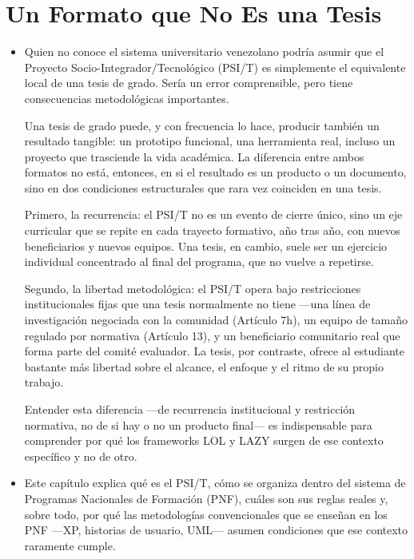 \documentclass[14pt,a4paper,oneside]{extbook}
\begin{document}
\section{ Un Formato que No Es una Tesis}
\begin{itemize}
\item Quien no conoce el sistema universitario venezolano podría asumir que el Proyecto Socio-Integrador/Tecnológico (PSI/T) es simplemente el equivalente local de una tesis de grado. Sería un error comprensible, pero tiene consecuencias metodológicas importantes.

Una tesis de grado puede, y con frecuencia lo hace, producir también un resultado tangible: un prototipo funcional, una herramienta real, incluso un proyecto que trasciende la vida académica. La diferencia entre ambos formatos no está, entonces, en si el resultado es un producto o un documento, sino en dos condiciones estructurales que rara vez coinciden en una tesis.

Primero, la recurrencia: el PSI/T no es un evento de cierre único, sino un eje curricular que se repite en cada trayecto formativo, año tras año, con nuevos beneficiarios y nuevos equipos. Una tesis, en cambio, suele ser un ejercicio individual concentrado al final del programa, que no vuelve a repetirse.

Segundo, la libertad metodológica: el PSI/T opera bajo restricciones institucionales fijas que una tesis normalmente no tiene —una línea de investigación negociada con la comunidad (Artículo 7h), un equipo de tamaño regulado por normativa (Artículo 13), y un beneficiario comunitario real que forma parte del comité evaluador. La tesis, por contraste, ofrece al estudiante bastante más libertad sobre el alcance, el enfoque y el ritmo de su propio trabajo.

Entender esta diferencia —de recurrencia institucional y restricción normativa, no de si hay o no un producto final— es indispensable para comprender por qué los frameworks LOL y LAZY surgen de ese contexto específico y no de otro.
\item Este capítulo explica qué es el PSI/T, cómo se organiza dentro del sistema de Programas Nacionales de Formación (PNF), cuáles son sus reglas reales y, sobre todo, por qué las metodologías convencionales que se enseñan en los PNF ---XP, historias de usuario, UML--- asumen condiciones que ese contexto raramente cumple.
\end{itemize}
\end{document}
